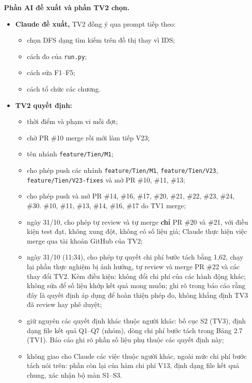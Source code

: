 \textbf{Phần AI đề xuất và phần TV2 chọn.}

\begin{itemize}
\tightlist
\item
  \textbf{Claude đề xuất,} TV2 đồng ý qua prompt tiếp theo:

  \begin{itemize}
  \tightlist
  \item
    chọn DFS dạng tìm kiếm trên đồ thị thay vì IDS;
  \item
    cách đo của \texttt{run.\allowbreak{}py};
  \item
    cách sửa F1--F5;
  \item
    cách tổ chức các chương.
  \end{itemize}
\item
  \textbf{TV2 quyết định:}

  \begin{itemize}
  \tightlist
  \item
    thời điểm và phạm vi mỗi đợt;
  \item
    chờ PR \#10 merge rồi mới làm tiếp V23;
  \item
    tên nhánh \texttt{feature/\allowbreak{}Tien/\allowbreak{}M1};
  \item
    cho phép push các nhánh \texttt{feature/\allowbreak{}Tien/\allowbreak{}M1}, \texttt{feature/\allowbreak{}Tien/\allowbreak{}V23}, \texttt{feature/\allowbreak{}Tien/\allowbreak{}V23-\allowbreak{}fixes} và mở PR \#10, \#11, \#13;
  \item
    cho phép push và mở PR \#14, \#16, \#17, \#20, \#21, \#22, \#23, \#24, \#30. \#10, \#11, \#13, \#14, \#16, \#17 do TV1 merge;
  \item
    ngày 31/10, cho phép tự review và tự merge \textbf{chỉ} PR \#20 và \#21, với điều kiện test đạt, không xung đột, không có số liệu giả; Claude thực hiện việc merge qua tài khoản GitHub của TV2;
  \item
    ngày 31/10 (11:34), cho phép tự quyết chi phí bước tách bằng 1,62, chạy lại phần thực nghiệm bị ảnh hưởng, tự review và merge PR \#22 và các thay đổi TV2. Kèm điều kiện: không đổi chi phí của các hành động khác; không sửa để số liệu khớp kết quả mong muốn; ghi rõ trong báo cáo rằng đây là quyết định áp dụng để hoàn thiện phép đo, không khẳng định TV3 đã review hay phê duyệt;
  \item
    giữ nguyên các quyết định khác thuộc người khác: bố cục S2 (TV3), định dạng file kết quả Q1--Q7 (nhóm), dòng chi phí bước tách trong Bảng 2.7 (TV1). Báo cáo ghi rõ phần số liệu phụ thuộc các quyết định này;
  \item
    không giao cho Claude các việc thuộc người khác, ngoài mức chi phí bước tách nói trên: phần còn lại của hàm chi phí V13, định dạng file kết quả chung, xác nhận bộ màn S1--S3.
  \end{itemize}
\end{itemize}

